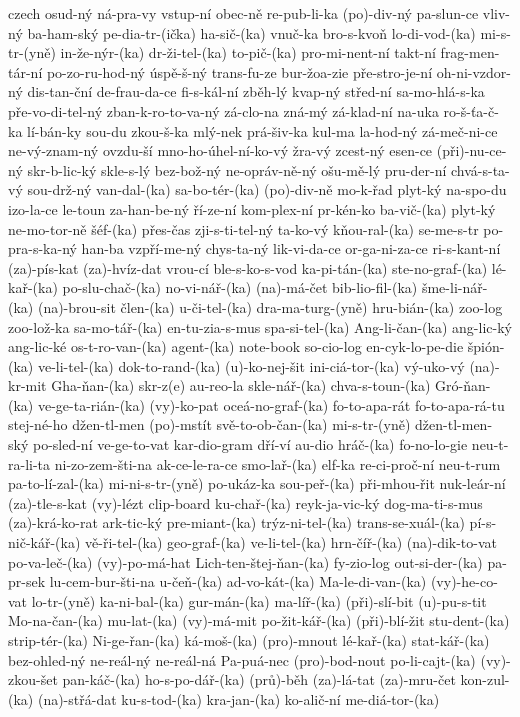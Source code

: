 \begin{hyphenrules}{czech}
{ osud-ný
 ná-pra-vy
 vstup-ní
 obec-ně
 re-pub-li-ka
 (po)-div-ný
 pa-slun-ce
 vliv-ný
 ba-ham-ský
 pe-dia-tr-(ička)
 ha-sič-(ka)
 vnuč-ka
 bro-s-kvoň
 lo-di-vod-(ka)
 mi-s-tr-(yně)
 in-že-nýr-(ka)
 dr-ži-tel-(ka)
 to-pič-(ka)
 pro-mi-nent-ní
 takt-ní
 frag-men-tár-ní
 po-zo-ru-hod-ný
 úspě-š-ný
 trans-fu-ze
 bur-žoa-zie
 pře-stro-je-ní
 oh-ni-vzdor-ný
 dis-tan-ční
 de-frau-da-ce
 fi-s-kál-ní
 zběh-lý
 kvap-ný
 střed-ní
 sa-mo-hlá-s-ka
 pře-vo-di-tel-ný
 zban-k-ro-to-va-ný
 zá-clo-na
 zná-mý
 zá-klad-ní
 na-uka
 ro-š-ťa-č-ka
 lí-bán-ky
 sou-du
 zkou-š-ka
 mlý-nek
 prá-šiv-ka
 kul-ma
 la-hod-ný
 zá-meč-ni-ce
 ne-vý-znam-ný
 ovzdu-ší
 mno-ho-úhel-ní-ko-vý
 žra-vý
 zcest-ný
 esen-ce
 (při)-nu-ce-ný
 skr-b-lic-ký
 skle-s-lý
 bez-bož-ný
 ne-opráv-ně-ný
 ošu-mě-lý
 pru-der-ní
 chvá-s-ta-vý
 sou-drž-ný
 van-dal-(ka)
 sa-bo-tér-(ka)
 (po)-div-ně
 mo-k-řad
 plyt-ký
 na-spo-du
 izo-la-ce
 le-toun
 za-han-be-ný
 ří-ze-ní
 kom-plex-ní
 pr-kén-ko
 ba-vič-(ka)
 plyt-ký
 ne-mo-tor-ně
 šéf-(ka)
 přes-čas
 zji-s-ti-tel-ný
 ta-ko-vý
 kňou-ral-(ka)
 se-me-s-tr
 po-pra-s-ka-ný
 han-ba
 vzpří-me-ný
 chys-ta-ný
 lik-vi-da-ce
 or-ga-ni-za-ce
 ri-s-kant-ní
 (za)-pís-kat
 (za)-hvíz-dat
 vrou-cí
 ble-s-ko-s-vod
 ka-pi-tán-(ka)
 ste-no-graf-(ka)
 lé-kař-(ka)
 po-slu-chač-(ka)
 no-vi-nář-(ka)
 (na)-má-čet
 bib-lio-fil-(ka)
 šme-li-nář-(ka)
 (na)-brou-sit
 člen-(ka)
 u-či-tel-(ka)
 dra-ma-turg-(yně)
 hru-bián-(ka)
 zoo-log
 zoo-lož-ka
 sa-mo-tář-(ka)
 en-tu-zia-s-mus
 spa-si-tel-(ka)
 Ang-li-čan-(ka)
 ang-lic-ký
 ang-lic-ké
 os-t-ro-van-(ka)
 agent-(ka)
 note-book
 so-cio-log
 en-cyk-lo-pe-die
 špión-(ka)
 ve-li-tel-(ka)
 dok-to-rand-(ka)
 (u)-ko-nej-šit
 ini-ciá-tor-(ka)
 vý-uko-vý
 (na)-kr-mit
 Gha-ňan-(ka)
 skr-z(e)
 au-reo-la
 skle-nář-(ka)
 chva-s-toun-(ka)
 Gró-ňan-(ka)
 ve-ge-ta-rián-(ka)
 (vy)-ko-pat
 oceá-no-graf-(ka)
 fo-to-apa-rát
 fo-to-apa-rá-tu
 stej-né-ho
 džen-tl-men
 (po)-mstít
 svě-to-ob-čan-(ka)
 mi-s-tr-(yně)
 džen-tl-men-ský
 po-sled-ní
 ve-ge-to-vat
 kar-dio-gram
 dří-ví
 au-dio
 hráč-(ka)
 fo-no-lo-gie
 neu-t-ra-li-ta
 ni-zo-zem-šti-na
 ak-ce-le-ra-ce
 smo-lař-(ka)
 elf-ka
 re-ci-proč-ní
 neu-t-rum
 pa-to-lí-zal-(ka)
 mi-ni-s-tr-(yně)
 po-ukáz-ka
 sou-peř-(ka)
 při-mhou-řit
 nuk-leár-ní
 (za)-tle-s-kat
 (vy)-lézt
 clip-board
 ku-chař-(ka)
 reyk-ja-vic-ký
 dog-ma-ti-s-mus
 (za)-krá-ko-rat
 ark-tic-ký
 pre-miant-(ka)
 trýz-ni-tel-(ka)
 trans-se-xuál-(ka)
 pí-s-nič-kář-(ka)
 vě-ři-tel-(ka)
 geo-graf-(ka)
 ve-li-tel-(ka)
 hrn-číř-(ka)
 (na)-dik-to-vat
 po-va-leč-(ka)
 (vy)-po-má-hat
 Lich-ten-štej-ňan-(ka)
 fy-zio-log
 out-si-der-(ka)
 pa-pr-sek
 lu-cem-bur-šti-na
 u-čeň-(ka)
 ad-vo-kát-(ka)
 Ma-le-di-van-(ka)
 (vy)-he-co-vat
 lo-tr-(yně)
 ka-ni-bal-(ka)
 gur-mán-(ka)
 ma-líř-(ka)
 (při)-slí-bit
 (u)-pu-s-tit
 Mo-na-čan-(ka)
 mu-lat-(ka)
 (vy)-má-mit
 po-žit-kář-(ka)
(při)-blí-žit
stu-dent-(ka)
strip-tér-(ka)
Ni-ge-řan-(ka)
ká-moš-(ka)
(pro)-mnout
lé-kař-(ka)
stat-kář-(ka)
bez-ohled-ný
ne-reál-ný
ne-reál-ná
Pa-puá-nec
(pro)-bod-nout
po-li-cajt-(ka)
(vy)-zkou-šet
pan-káč-(ka)
ho-s-po-dář-(ka)
(prů)-běh
(za)-lá-tat
(za)-mru-čet
kon-zul-(ka)
(na)-střá-dat
ku-s-tod-(ka)
kra-jan-(ka)
ko-alič-ní
me-diá-tor-(ka)
  }
\end{hyphenrules}
